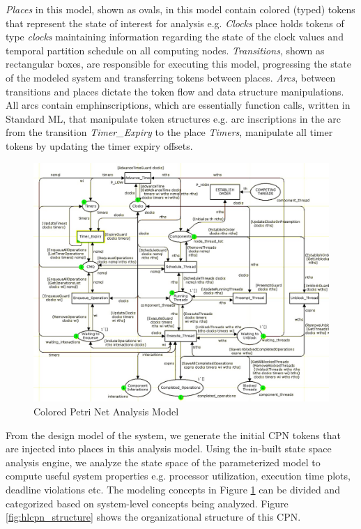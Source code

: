 \emph{Places} in this model, shown as ovals, in this model contain
colored (typed) tokens that represent the state of interest for
analysis e.g. \emph{Clocks} place holds tokens of type \emph{clocks}
maintaining information regarding the state of the clock values and
temporal partition schedule on all computing
nodes. \emph{Transitions}, shown as rectangular boxes, are responsible
for executing this model, progressing the state of the modeled system
and transferring tokens between places. \emph{Arcs}, between
transitions and places dictate the token flow and data structure
manipulations. All arcs contain emph{inscriptions}, which are
essentially function calls, written in Standard ML, that manipulate
token structures e.g. arc inscriptions in the arc from the transition
\emph{Timer\_Expiry} to the place \emph{Timers}, manipulate all timer
tokens by updating the timer expiry offsets.

\begin{figure}[h]
	\centering
        \includegraphics[width=\textwidth]{./Figures/hlcpn_cropped}
	\caption{Colored Petri Net Analysis Model}
	\label{fig:hlcpn}
\end{figure}

From the design model of the system, we generate the initial CPN
tokens that are injected into places in this analysis model. Using the
in-built state space analysis engine, we analyze the state space of
the parameterized model to compute useful system properties
e.g. processor utilization, execution time plots, deadline violations
etc. The modeling concepts in Figure \ref{fig:hlcpn} can be divided
and categorized based on system-level concepts being analyzed. Figure
\ref{fig:hlcpn_structure} shows the organizational structure of this
CPN.

